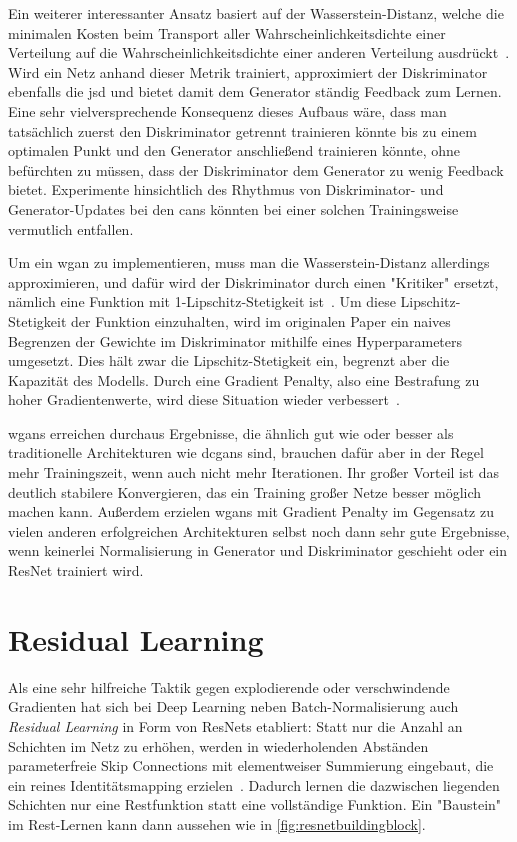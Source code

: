 Ein weiterer interessanter Ansatz basiert auf der Wasserstein-Distanz, welche die minimalen Kosten beim Transport aller Wahrscheinlichkeitsdichte einer Verteilung auf die Wahrscheinlichkeitsdichte einer anderen Verteilung ausdrückt~\cite{Arjovsky.2017}.
Wird ein Netz anhand dieser Metrik trainiert, approximiert der Diskriminator ebenfalls die \gls{jsd} und bietet damit dem Generator ständig Feedback zum Lernen.
Eine sehr vielversprechende Konsequenz dieses Aufbaus wäre, dass man tatsächlich zuerst den Diskriminator getrennt trainieren könnte bis zu einem optimalen Punkt und den Generator anschließend trainieren könnte, ohne befürchten zu müssen, dass der Diskriminator dem Generator zu wenig Feedback bietet.
Experimente hinsichtlich des Rhythmus von Diskriminator- und Generator-Updates bei den \glspl{can} könnten bei einer solchen Trainingsweise vermutlich entfallen.

Um ein \gls{wgan} zu implementieren, muss man die Wasserstein-Distanz allerdings approximieren, und dafür wird der Diskriminator durch einen "Kritiker" ersetzt, nämlich eine Funktion mit 1-Lipschitz-Stetigkeit ist~\cite{Arjovsky.2017b}.
Um diese Lipschitz-Stetigkeit der Funktion einzuhalten, wird im originalen Paper ein naives Begrenzen der Gewichte im Diskriminator mithilfe eines Hyperparameters umgesetzt.
Dies hält zwar die Lipschitz-Stetigkeit ein, begrenzt aber die Kapazität des Modells.
Durch eine Gradient Penalty, also eine Bestrafung zu hoher Gradientenwerte, wird diese Situation wieder verbessert~\cite{Gulrajani.2017}.

\glspl{wgan} erreichen durchaus Ergebnisse, die ähnlich gut wie oder besser als traditionelle Architekturen wie \glspl{dcgan} sind, brauchen dafür aber in der Regel mehr Trainingszeit, wenn auch nicht mehr Iterationen.
Ihr großer Vorteil ist das deutlich stabilere Konvergieren, das ein Training großer Netze besser möglich machen kann.
Außerdem erzielen \glspl{wgan} mit Gradient Penalty im Gegensatz zu vielen anderen erfolgreichen Architekturen selbst noch dann sehr gute Ergebnisse, wenn keinerlei Normalisierung in Generator und Diskriminator geschieht oder ein ResNet trainiert wird.



\section{Residual Learning}

Als eine sehr hilfreiche Taktik gegen explodierende oder verschwindende Gradienten hat sich bei Deep Learning neben Batch-Normalisierung auch \emph{Residual Learning} in Form von ResNets etabliert:
Statt nur die Anzahl an Schichten im Netz zu erhöhen, werden in wiederholenden Abständen parameterfreie Skip Connections mit elementweiser Summierung eingebaut, die ein reines Identitätsmapping erzielen~\cite{He.2016}.
Dadurch lernen die dazwischen liegenden Schichten nur eine Restfunktion statt eine vollständige Funktion.
Ein "Baustein" im Rest-Lernen kann dann aussehen wie in \autoref{fig:resnetbuildingblock}.

